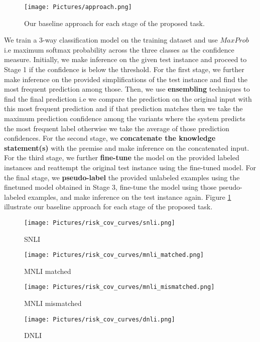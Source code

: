 \documentclass[11pt,a4paper]{article}
\begin{document}
\begin{figure}[t]
    \centering
    \texttt{[image: Pictures/approach.png]}
    \caption{Our baseline approach for each stage of the proposed task.}
    \label{fig:approach}
    \end{figure}
We train a 3-way classification model on the training dataset and use $MaxProb$ i.e maximum softmax probability across the three classes as the confidence measure.
Initially, we make inference on the given test instance and proceed to Stage 1 if the confidence is below the threshold.
For the first stage, we further make inference on the provided simplifications of the test instance and find the most frequent prediction among those.
Then, we use \textbf{ensembling} techniques to find the final prediction i.e we compare the prediction on the original input with this most frequent prediction and if that prediction matches then we take the maximum prediction confidence among the variants where the system predicts the most frequent label otherwise we take the average of those prediction confidences.
For the second stage, we \textbf{concatenate the knowledge statement(s)} with the premise and make inference on the concatenated input.
For the third stage, we further \textbf{fine-tune} the model on the provided labeled instances and reattempt the original test instance using the fine-tuned model. 
For the final stage, we \textbf{pseudo-label} the provided unlabeled examples using the finetuned model obtained in Stage 3, fine-tune the model using those pseudo-labeled examples, and make inference on the test instance again. Figure \ref{fig:approach} illustrate our baseline approach for each stage of the proposed task.

\begin{figure*}[t]
\centering

    \begin{subfigure}{.46\textwidth}
        \texttt{[image: Pictures/risk\_cov\_curves/snli.png]}
        \caption{SNLI}
    \end{subfigure}
    \begin{subfigure}{.46\textwidth}
        \texttt{[image: Pictures/risk\_cov\_curves/mnli\_matched.png]}
        \caption{MNLI matched}
    \end{subfigure}
    \newline
    \begin{subfigure}{.46\textwidth}
        \texttt{[image: Pictures/risk\_cov\_curves/mnli\_mismatched.png]}
        \caption{MNLI mismatched}
    \end{subfigure}
    \begin{subfigure}{.46\textwidth}
        \texttt{[image: Pictures/risk\_cov\_curves/dnli.png]}
        \caption{DNLI}
    \end{subfigure}
    \caption{Risk coverage curves for all datasets in Stages 0, 1, 2, and 3.}
    \label{fig:risk_coverage_curves}    
\end{figure*}
\end{document}
